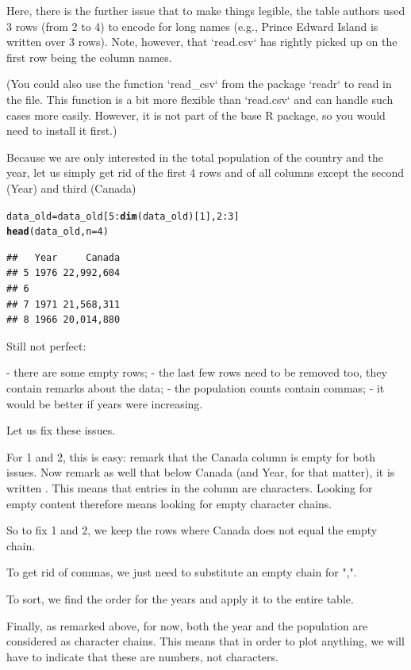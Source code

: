 \documentclass[aspectratio=169]{beamer}\usepackage[]{graphicx}\usepackage[]{xcolor}
\makeatletter
\newcommand{\hlnum}[1]{\textcolor[rgb]{0.686,0.059,0.569}{#1}}%
\newcommand{\hlopt}[1]{\textcolor[rgb]{0,0,0}{#1}}%
\newcommand{\hldef}[1]{\textcolor[rgb]{0.345,0.345,0.345}{#1}}%
\newcommand{\hlkwb}[1]{\textcolor[rgb]{0.69,0.353,0.396}{#1}}%
\newcommand{\hlkwc}[1]{\textcolor[rgb]{0.333,0.667,0.333}{#1}}%
\newcommand{\hlkwd}[1]{\textcolor[rgb]{0.737,0.353,0.396}{\textbf{#1}}}%
\newenvironment{kframe}{%
 \def\at@end@of@kframe{}%
 \ifinner\ifhmode%
  \def\at@end@of@kframe{\end{minipage}}%
  \begin{minipage}{\columnwidth}%
 \fi\fi%
 \def\FrameCommand##1{\hskip\@totalleftmargin \hskip-\fboxsep
 \colorbox{shadecolor}{##1}\hskip-\fboxsep
     \hskip-\linewidth \hskip-\@totalleftmargin \hskip\columnwidth}%
 \MakeFramed {\advance\hsize-\width
   \@totalleftmargin\z@ \linewidth\hsize
   \@setminipage}}%
 {\par\unskip\endMakeFramed%
 \at@end@of@kframe}
\newenvironment{knitrout}{}{} %
\makeatother
\begin{document}
\begin{frame}[fragile]
Here, there is the further issue that to make things legible, the table authors used 3 rows (from 2 to 4) to encode for long names (e.g., Prince Edward Island is written over 3 rows). Note, however, that `read.csv` has rightly picked up on the first row being the column names.

(You could also use the function `read\_csv` from the package `readr` to read in the file. This function is a bit more flexible than `read.csv` and can handle such cases more easily. However, it is not part of the base R package, so you would need to install it first.)

Because we are only interested in the total population of the country and the year, let us simply get rid of the first 4 rows and of all columns except the second (Year) and third (Canada)

\begin{knitrout}
\color{fgcolor}\begin{kframe}
\begin{alltt}
\hldef{data_old} \hlkwb{=} \hldef{data_old[}\hlnum{5}\hlopt{:}\hlkwd{dim}\hldef{(data_old)[}\hlnum{1}\hldef{],} \hlnum{2}\hlopt{:}\hlnum{3}\hldef{]}
\hlkwd{head}\hldef{(data_old,} \hlkwc{n}\hldef{=}\hlnum{4}\hldef{)}
\end{alltt}
\begin{verbatim}
##   Year     Canada
## 5 1976 22,992,604
## 6                
## 7 1971 21,568,311
## 8 1966 20,014,880
\end{verbatim}
\end{kframe}
\end{knitrout}
\end{frame}


\begin{frame}
Still not perfect:

- there are some empty rows;
- the last few rows need to be removed too, they contain remarks about the data;
- the population counts contain commas;
- it would be better if years were increasing.

Let us fix these issues.

For 1 and 2, this is easy: remark that the Canada column is empty for both issues. Now remark as well that below Canada (and Year, for that matter), it is written . This means that entries in the column are characters. Looking for empty content therefore means looking for empty character chains.

So to fix 1 and 2, we keep the rows where Canada does not equal the empty chain.

To get rid of commas, we just need to substitute an empty chain for ",".

To sort, we find the order for the years and apply it to the entire table.

Finally, as remarked above, for now, both the year and the population are considered as character chains. This means that in order to plot anything, we will have to indicate that these are numbers, not characters.
\end{frame}
\end{document}
